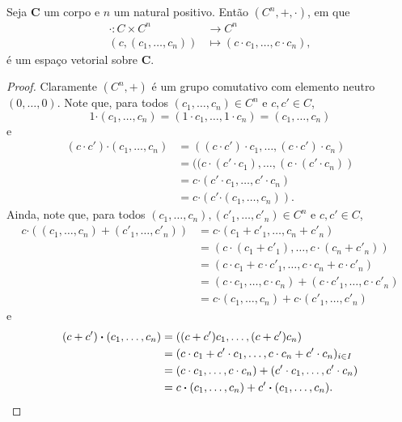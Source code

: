 \begin{prop}
	Seja $\bm C$ um corpo e $n$ um natural positivo. Então $(C^n,+,\bm\cdot)$, em que
	\begin{align*}
	\bm\cdot : C \times C^n &\to C^n \\
		(c,(c_1,\ldots,c_n)) &\mapsto (c \cdot c_1,\ldots,c \cdot c_n),
	\end{align*}
é um espaço vetorial sobre $\bm C$.
\end{prop}
\begin{proof}
	Claramente $(C^n,+)$ é um grupo comutativo com elemento neutro $(0,\ldots,0)$. Note que, para todos $(c_1,\ldots,c_n) \in C^n$ e $c,c' \in C$,
	\begin{equation*}
	1 \bm\cdot (c_1,\ldots,c_n) = (1 \cdot c_1,\ldots,1 \cdot c_n) = (c_1,\ldots,c_n)
	\end{equation*}
e
	\begin{align*}
	(c \cdot c') \bm\cdot (c_1,\ldots,c_n) &= ((c \cdot c') \cdot c_1, \ldots, (c \cdot c') \cdot c_n) \\
	&= ((c \cdot (c' \cdot c_1), \ldots, (c \cdot (c' \cdot c_n)) \\
	&= c \bm\cdot (c' \cdot c_1,\ldots,c' \cdot c_n) \\
	&= c \bm\cdot (c' \bm\cdot (c_1,\ldots,c_n)).
	\end{align*}
	Ainda, note que, para todos $(c_1,\ldots,c_n), (c'_1,\ldots,c'_n) \in C^n$ e $c,c' \in C$,
	\begin{align*}
	c \bm\cdot ((c_1,\ldots,c_n) + (c'_1,\ldots,c'_n)) &= c \bm\cdot (c_1+c'_1,\ldots,c_n+c'_n) \\
	&= (c \cdot (c_1+c'_1),\ldots,c \cdot (c_n+c'_n)) \\
	&= (c \cdot c_1 + c \cdot c'_1,\ldots,c \cdot c_n + c \cdot c'_n) \\
	&= (c \cdot c_1,\ldots,c \cdot c_n) + (c \cdot c'_1,\ldots,c \cdot c'_n) \\
	&= c \bm\cdot (c_1,\ldots,c_n) + c \bm\cdot (c'_1,\ldots,c'_n)
	\end{align*}
e
	\begin{align*}
	(c+c') \bm\cdot (c_1,\ldots,c_n) &= ((c+c')c_1,\ldots,(c+c')c_n) \\
	&= (c \cdot c_1 + c' \cdot c_1,\ldots,c \cdot c_n + c' \cdot c_n)_{i \in I} \\
	&= (c \cdot c_1,\ldots,c \cdot c_n) + (c' \cdot c_1,\ldots,c' \cdot c_n) \\
	&= c \bm\cdot (c_1,\ldots,c_n) + c' \bm\cdot (c_1,\ldots,c_n).  \qedhere
	\end{align*}
\end{proof}

